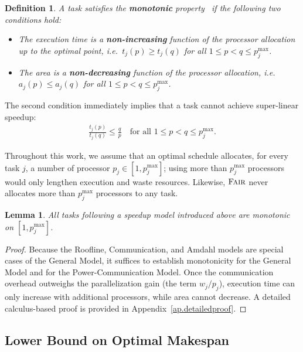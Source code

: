 \documentclass{article}
\newtheorem{lemma}{Lemma}
\newtheorem{definition}{Definition}
\newcommand\fair{\textsc{Fair}\xspace}
\begin{document}
\begin{definition}
\label{def.mono}
A task satisfies the \textbf{\emph{monotonic}} property~\cite{Lepere01_DAG, ICPP22} if the following two conditions hold:
\begin{itemize}
  \item The execution time is a \textbf{\emph{non-increasing}} function of the processor allocation up to the optimal point, i.e.\ $t_j(p) \ge t_j(q)$ for all $1 \le p < q \le p_j^{\max}$.
  \item The area is a \textbf{\emph{non-decreasing}} function of the processor allocation, i.e.\ $a_j(p) \le a_j(q)$ for all $1 \le p < q \le p_j^{\max}$.
\end{itemize}
\end{definition}

The second condition immediately implies that a task cannot achieve super-linear speedup:
\begin{align}\label{eq.speedup_bound}
\frac{t_j(p)}{t_j(q)} \le \frac{q}{p}\quad\text{for all } 1 \le p < q \le p_j^{\max}.
\end{align}

Throughout this work, we assume that an optimal schedule allocates, for every task $j$, a number of processor \(p_j \in [1, p_j^{\max}]\); using more than \(p_j^{\max}\) processors would only lengthen execution and waste resources. Likewise, $\fair$ never allocates more than \(p_j^{\max}\) processors to any task.

\begin{lemma}
All tasks following a speedup model introduced above are monotonic on $[1, p_j^{\max}]$.
\end{lemma}

\begin{proof}
Because the Roofline, Communication, and Amdahl models are special cases of the General Model, it suffices to establish monotonicity for the General Model and for the Power-Communication Model.  
Once the communication overhead outweighs the parallelization gain (the term $w_j/p_j$), execution time can only increase with additional processors, while area cannot decrease. A detailed calculus-based proof is provided in Appendix~\ref{ap.detailedproof}.
\end{proof}




\subsection{Lower Bound on Optimal Makespan}
\end{document}
